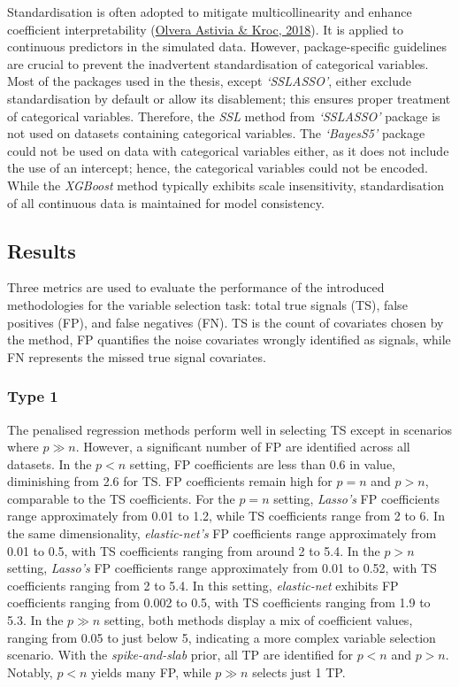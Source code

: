 \documentclass[
  11pt,
]{article}
\begin{document}
Standardisation is often adopted to mitigate multicollinearity and
enhance coefficient interpretability
(\protect\hyperlink{ref-Astivia2018}{Olvera Astivia \& Kroc, 2018}). It
is applied to continuous predictors in the simulated data. However,
package-specific guidelines are crucial to prevent the inadvertent
standardisation of categorical variables. Most of the packages used in
the thesis, except \emph{`SSLASSO'}, either exclude standardisation by
default or allow its disablement; this ensures proper treatment of
categorical variables. Therefore, the \emph{SSL} method from
\emph{`SSLASSO'} package is not used on datasets containing categorical
variables. The \emph{`BayesS5'} package could not be used on data with
categorical variables either, as it does not include the use of an
intercept; hence, the categorical variables could not be encoded. While
the \emph{XGBoost} method typically exhibits scale insensitivity,
standardisation of all continuous data is maintained for model
consistency.

\subsection{Results}

Three metrics are used to evaluate the performance of the introduced
methodologies for the variable selection task: total true signals (TS),
false positives (FP), and false negatives (FN). TS is the count of
covariates chosen by the method, FP quantifies the noise covariates
wrongly identified as signals, while FN represents the missed true
signal covariates.

\subsubsection{Type 1}

The penalised regression methods perform well in selecting TS except in
scenarios where \(p \gg n\). However, a significant number of FP are
identified across all datasets. In the \(p<n\) setting, FP coefficients
are less than 0.6 in value, diminishing from 2.6 for TS. FP coefficients
remain high for \(p=n\) and \(p>n\), comparable to the TS coefficients.
For the \(p=n\) setting, \emph{Lasso's} FP coefficients range
approximately from 0.01 to 1.2, while TS coefficients range from 2 to 6.
In the same dimensionality, \emph{elastic-net's} FP coefficients range
approximately from 0.01 to 0.5, with TS coefficients ranging from around
2 to 5.4. In the \(p>n\) setting, \emph{Lasso's} FP coefficients range
approximately from 0.01 to 0.52, with TS coefficients ranging from 2 to
5.4. In this setting, \emph{elastic-net} exhibits FP coefficients
ranging from 0.002 to 0.5, with TS coefficients ranging from 1.9 to 5.3.
In the \(p \gg n\) setting, both methods display a mix of coefficient
values, ranging from 0.05 to just below 5, indicating a more complex
variable selection scenario. With the \emph{spike-and-slab} prior, all
TP are identified for \(p<n\) and \(p>n\). Notably, \(p<n\) yields many
FP, while \(p \gg n\) selects just 1 TP.
\end{document}
